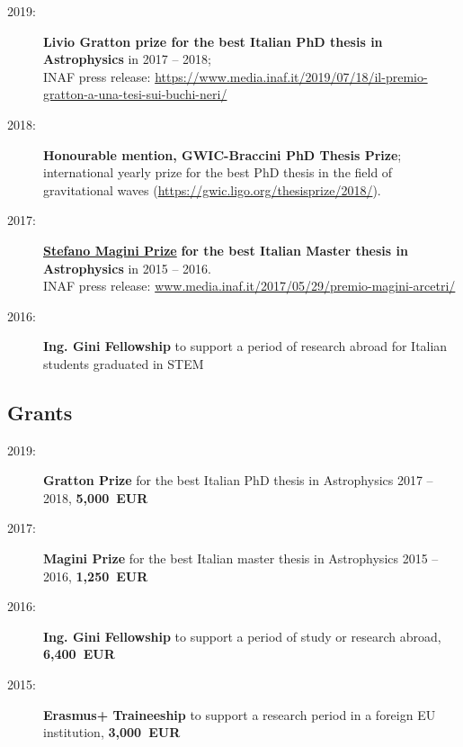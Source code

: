\documentclass[11pt,a4paper]{article}
\begin{document}
\begin{description}

    \item[2019:] \textbf{Livio Gratton prize for the best Italian PhD thesis in Astrophysics} in 2017 -- 2018;\\ { INAF press release: \href{https://www.media.inaf.it/2019/07/18/il-premio-gratton-a-una-tesi-sui-buchi-neri/}{\small \normalfont https://www.media.inaf.it/2019/07/18/il-premio-gratton-a-una-tesi-sui-buchi-neri/}}

    \item[2018:] \textbf{Honourable mention, GWIC-Braccini PhD Thesis Prize}; international yearly prize for the best PhD thesis in the field of gravitational waves {\small (\href{https://gwic.ligo.org/thesisprize/2018/}{https://gwic.ligo.org/thesisprize/2018/})}. 

    \item[2017:] {\textbf{\href{https://www.arcetri.astro.it/ricerca/premio-stefano-magini}{Stefano Magini Prize}}} {\bf for the best Italian Master thesis in Astrophysics} in 2015 -- 2016.\\
    { INAF press release: \href{http://www.media.inaf.it/2017/05/29/premio-magini-arcetri/}{ \small www.media.inaf.it/2017/05/29/premio-magini-arcetri/}}

    \item[2016:]  {\textbf{Ing. Gini Fellowship}} to support a period of research abroad for Italian students graduated in STEM

\end{description}

\subsection*{Grants}

\begin{description}

    \item[2019:] {\bf Gratton Prize} for the best Italian PhD thesis in Astrophysics 2017 -- 2018,  {\bf 5,000~EUR}

    \item[2017:] {\bf Magini Prize} for the best Italian master thesis in Astrophysics 2015 -- 2016,  {\bf 1,250~EUR}

    \item[2016:]{ \bf Ing. Gini Fellowship} to support a period of study or research abroad,  {\bf 6,400~EUR}

    \item[2015:] {\bf Erasmus+ Traineeship} to support a research period  in a foreign EU institution,  {\bf 3,000~EUR}

\end{description}
\end{document}
